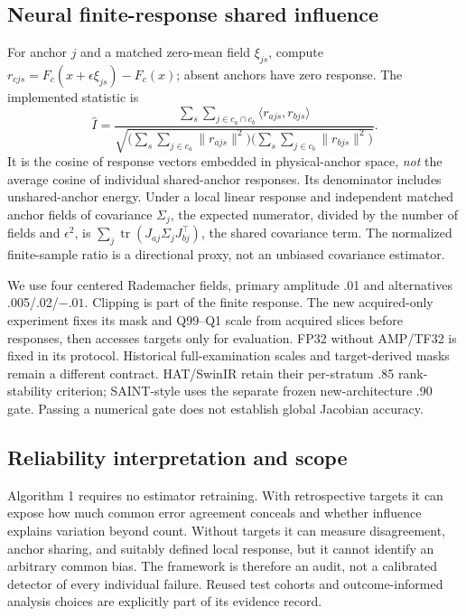 \documentclass[10pt,twocolumn,letterpaper]{article}
\begin{document}
\subsection{Neural finite-response shared influence}
For anchor $j$ and a matched zero-mean field $\xi_{js}$, compute $r_{cjs}=F_c(x+\epsilon\xi_{js})-F_c(x)$; absent anchors have zero response. The implemented statistic is
\begin{equation}
\widehat I=
\frac{\sum_s\sum_{j\in c_a\cap c_b}\langle r_{ajs},r_{bjs}\rangle}
{\sqrt{\bigl(\sum_s\sum_{j\in c_a}\|r_{ajs}\|^2\bigr)
\bigl(\sum_s\sum_{j\in c_b}\|r_{bjs}\|^2\bigr)}}.\label{eq:influence}
\end{equation}
It is the cosine of response vectors embedded in physical-anchor space, \emph{not} the average cosine of individual shared-anchor responses. Its denominator includes unshared-anchor energy. Under a local linear response and independent matched anchor fields of covariance $\Sigma_j$, the expected numerator, divided by the number of fields and $\epsilon^2$, is $\sum_j\operatorname{tr}(J_{aj}\Sigma_jJ_{bj}^\top)$, the shared covariance term. The normalized finite-sample ratio is a directional proxy, not an unbiased covariance estimator.

We use four centered Rademacher fields, primary amplitude .01 and alternatives .005/.02/$-.01$. Clipping is part of the finite response. The new acquired-only experiment fixes its mask and Q99--Q1 scale from acquired slices before responses, then accesses targets only for evaluation. FP32 without AMP/TF32 is fixed in its protocol. Historical full-examination scales and target-derived masks remain a different contract. HAT/SwinIR retain their per-stratum .85 rank-stability criterion; SAINT-style uses the separate frozen new-architecture .90 gate. Passing a numerical gate does not establish global Jacobian accuracy.

\subsection{Reliability interpretation and scope}
Algorithm 1 requires no estimator retraining. With retrospective targets it can expose how much common error agreement conceals and whether influence explains variation beyond count. Without targets it can measure disagreement, anchor sharing, and suitably defined local response, but it cannot identify an arbitrary common bias. The framework is therefore an audit, not a calibrated detector of every individual failure. Reused test cohorts and outcome-informed analysis choices are explicitly part of its evidence record.
\end{document}
